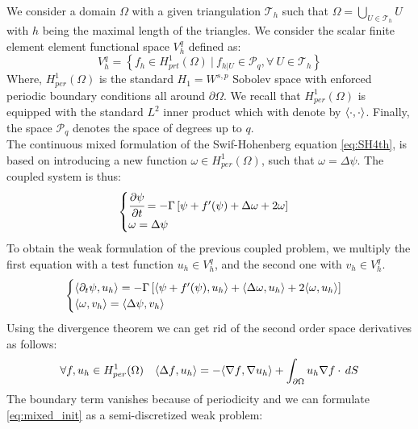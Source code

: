 \documentclass{article}
\begin{document}
We consider a domain $\Omega$ with a given triangulation $\mathcal{T}_h$ such that $\Omega = \bigcup_{U \in \mathcal{T}_h} U$ with $h$ being the maximal length of the triangles. We consider the scalar finite element element functional space $V_h^q$ defined as:
\begin{equation}
   V_h^q = \left\{ f_h \in H^1_{prt}(\Omega) \: \vert \: f_{h|U} \in \mathcal{P}_q, \forall \: U \in \mathcal{T}_h \right\}
\end{equation}
Where, $H^1_{per}(\Omega)$ is the standard $H_1 = W^{s,p}$ Sobolev space with enforced periodic boundary conditions all around $\partial \Omega$. We recall that $H^1_{per}(\Omega)$ is equipped with the standard $L^2$ inner product which with denote by $\langle{\cdot},{\cdot}\rangle$. Finally, the space $\mathcal{P}_q$ denotes the space of degrees up to $q$.\\


The continuous mixed formulation of the Swif-Hohenberg equation \cref{eq:SH4th}, is based on introducing a new function $\omega \in H^1_{per}(\Omega)$, such that $\omega = \Delta \psi$. The coupled system is thus:
\begin{equation}
   \begin{cases}
      \cfrac{\partial \psi}{\partial t} =  -\Gamma \left[ \psi + f'(\psi) + \Delta \omega+2 \omega  \right] \\
      \omega = \Delta \psi
   \end{cases}
\end{equation}
To obtain the weak formulation of the previous coupled problem, we multiply the first equation with a test function $u_h \in V_h^q$, and the second one with $v_h \in V_h^q$.
\begin{equation}\label{eq:mixed_init}
   \begin{cases}
      \langle{\partial_t\psi},{u_h}\rangle=  -\Gamma \left[ \langle{\psi + f'(\psi)},{u_h}\rangle + \langle{\Delta \omega},{u_h}\rangle+2 \langle{\omega},{u_h}\rangle  \right] \\
      \langle{\omega},{v_h}\rangle = \langle{\Delta \psi},{v_h}\rangle
   \end{cases}
\end{equation}
Using the divergence theorem we can get rid of the second order space derivatives as follows:
\begin{equation}
 \forall f, u_h \in H^1_{per}(\Omega) \quad \langle{\Delta f},{u_h}\rangle = - \langle{\nabla f},{ \nabla u_h}\rangle + \int_{\partial \Omega} u_h \nabla f \cdot \,dS
\end{equation}
The boundary term vanishes because of periodicity and we can formulate \cref{eq:mixed_init} as a semi-discretized weak problem:
\end{document}
